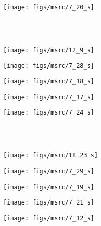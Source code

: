 \begin{titlepage}
\begin{figure}[ht]
	\begin{minipage}[]{0.19\linewidth}
		\centering
		\texttt{[image: figs/msrc/7\_20\_s]}
	\end{minipage}
	\\
	\vspace{0.5cm}
	\\
	\begin{minipage}[]{0.19\linewidth}
		\centering
		\texttt{[image: figs/msrc/12\_9\_s]}
	\end{minipage}
	\begin{minipage}[]{0.19\linewidth}
		\centering
		\texttt{[image: figs/msrc/7\_28\_s]}
	\end{minipage}
	\begin{minipage}[]{0.19\linewidth}
		\centering
		\texttt{[image: figs/msrc/7\_18\_s]}
	\end{minipage}
	\begin{minipage}[]{0.19\linewidth}
		\centering
		\texttt{[image: figs/msrc/7\_17\_s]}
	\end{minipage}
	\begin{minipage}[]{0.19\linewidth}
		\centering
		\texttt{[image: figs/msrc/7\_24\_s]}
	\end{minipage}
	\\
	\vspace{0.5cm}
	\\
	\begin{minipage}[]{0.19\linewidth}
		\centering
		\texttt{[image: figs/msrc/18\_23\_s]}
	\end{minipage}
	\begin{minipage}[]{0.19\linewidth}
		\centering
		\texttt{[image: figs/msrc/7\_29\_s]}
	\end{minipage}
	\begin{minipage}[]{0.19\linewidth}
		\centering
		\texttt{[image: figs/msrc/7\_19\_s]}
	\end{minipage}
	\begin{minipage}[]{0.19\linewidth}
		\centering
		\texttt{[image: figs/msrc/7\_21\_s]}
	\end{minipage}
	\begin{minipage}[]{0.19\linewidth}
		\centering
		\texttt{[image: figs/msrc/7\_12\_s]}
	\end{minipage}
	

\end{figure}
\end{titlepage}
